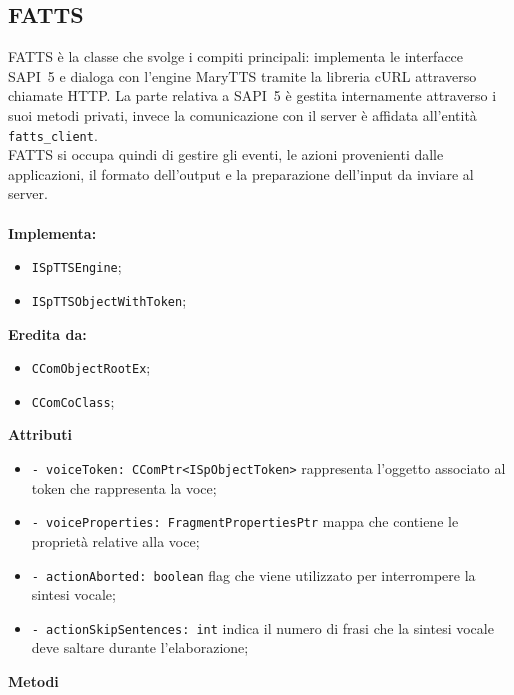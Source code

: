 \subsection{FATTS}
FATTS è la classe che svolge i compiti principali: implementa le interfacce SAPI~5 e dialoga con l'engine MaryTTS tramite la libreria cURL attraverso chiamate HTTP. La parte relativa a SAPI~5 è gestita internamente attraverso i suoi metodi privati, invece la comunicazione con il server è affidata all'entità \texttt{fatts\_client}.\\
FATTS si occupa quindi di gestire gli eventi, le azioni provenienti dalle applicazioni, il formato dell'output e la preparazione dell'input da inviare al server.\\\\    
\textbf{Implementa:}
\begin{itemize}
	\item \texttt{ISpTTSEngine};
	\item \texttt{ISpTTSObjectWithToken};
\end{itemize}
\textbf{Eredita da:}
\begin{itemize}
	\item \texttt{CComObjectRootEx};
	\item \texttt{CComCoClass};
\end{itemize}
\textbf{Attributi}
\begin{itemize}
	\item \texttt{- voiceToken: CComPtr<ISpObjectToken>} rappresenta l'oggetto associato al token che rappresenta la voce;
	\item \texttt{- voiceProperties: FragmentPropertiesPtr} mappa che contiene le proprietà relative alla voce;
	\item \texttt{- actionAborted: boolean} flag che viene utilizzato per interrompere la sintesi vocale;
	\item \texttt{- actionSkipSentences: int} indica il numero di frasi che la sintesi vocale deve saltare durante l'elaborazione;   
\end{itemize}
\textbf{Metodi}
